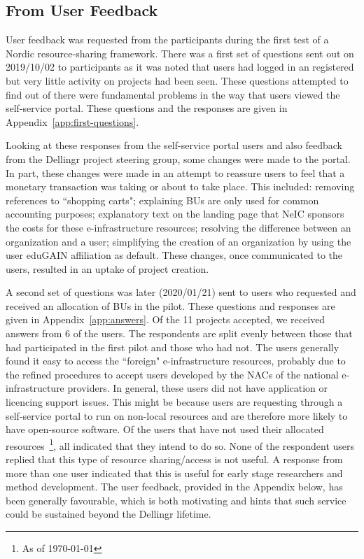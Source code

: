 \documentclass{article}
\newcommand{\dell}{Dellingr\xspace}
\newcommand{\einfra}{e-infrastructure\xspace}
\newcommand{\pilot}{first test of a Nordic resource-sharing framework\xspace}
\newcommand{\accepted}{11\xspace}
\begin{document}
\subsection{From User Feedback}

User feedback was requested from the participants during the \pilot.
There was a first set of questions sent out on 2019/10/02 to participants as it was noted that users had logged in an registered but very little activity on projects had been seen.
These questions attempted to find out of there were fundamental problems in the way that users viewed the self-service portal.
These questions and the responses are given in Appendix~\ref{app:first-questions}.

Looking at these responses from the self-service portal users and also feedback from the \dell project steering group, some changes were made to the portal.
In part, these changes were made in an attempt to reassure users to feel that
a monetary transaction was taking or about to take place.
This included: removing references to ``shopping carts"; explaining BUs are only used for common accounting purposes; explanatory text on the landing page that NeIC sponsors the costs for these \einfra resources; resolving the difference between an organization and a user; simplifying the creation of an organization by using the user eduGAIN affiliation as default.
These changes, once communicated to the users, resulted in an uptake of project creation.

A second set of questions was later (2020/01/21) sent to users 
who requested and received an allocation of BUs in the pilot.
These questions and responses are given in Appendix~\ref{app:answers}.
Of the \accepted projects accepted, we received answers from 6 of the users.
The respondents are split evenly between those that had participated in the first pilot and those who had not.
The users generally found it easy to access the ``foreign" \einfra resources, probably due to the refined procedures to accept users developed by the NACs of the national \einfra providers.
In general, these users did not have application or licencing support issues.
This might be because users are requesting through a self-service portal to run on non-local resources and are therefore more likely to have open-source software.
Of the users that have not used their allocated resources~\footnote{As of \today}, all indicated that they intend to do so.
None of the respondent users replied that this type of resource sharing/access
is not useful.
A response from more than one user indicated that this is useful for early stage researchers and method development.
The user feedback, provided in the Appendix below, has been generally favourable, which is both motivating and hints that such service could be sustained beyond the \dell lifetime.
\end{document}
